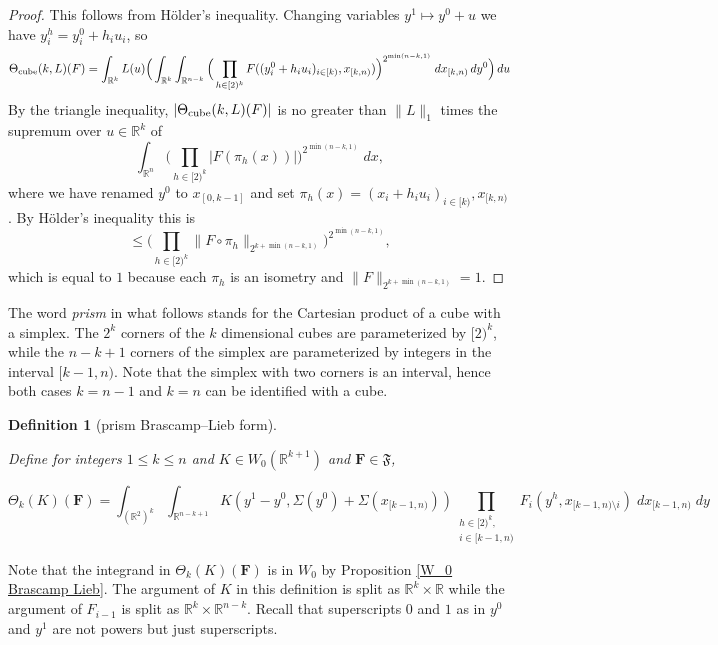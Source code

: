 \documentclass[12pt,reqno]{amsart}
\theoremstyle{plain}
\newtheorem{definition}[theorem]{Definition}
\numberwithin{equation}{section}
\theoremstyle{remark}
\newcommand{\uses}[1]{}
\newcommand{\usesdefs}[1]{}
\newcommand{\lean}[1]{}
\newcommand{\R}{{\mathbb R}}
\newcommand{\F}{\mathbf{F}}
\begin{document}
\begin{proof}
This follows from H\"older's inequality.
Changing variables $y^1\mapsto y^0 + u$ we have $y^h_i=y^0_i+h_i u_i$, so
\[ \Theta_{{\rm cube}}(k,L)(F) = \int_{\R^k} L(u) \Big(\int_{\R^k}\int_{\R^{n-k}} \Big(\prod_{h\in [2)^k} F((y^0_i+h_i u_i)_{i\in [k)}, x_{[k,n)})\Big)^{2^{\min(n-k,1)}}\;dx_{[k,n)}\,dy^0\Big)\,du \]
By the triangle inequality, $|\Theta_{{\rm cube}}(k,L)(F)|$ is no greater than $\|L\|_1$ times the supremum over $u\in\R^k$ of
\[ \int_{\R^n} \Big(\prod_{h\in [2)^k} |F(\pi_h(x))|\Big)^{2^{\min(n-k,1)}}\;dx, \]
where we have renamed $y^0$ to $x_{[0,k-1]}$
and set $\pi_h(x)=(x_i+h_i u_i)_{i\in [k)}, x_{[k,n)}$. By H\"older's inequality this is
\[ \le \Big(\prod_{h\in [2)^k} \|F\circ \pi_h\|_{2^{k+\min(n-k,1)}}\Big)^{2^{\min(n-k,1)}}, \]
which is equal to $1$ because each $\pi_h$ is an isometry and $\|F\|_{2^{k+\min(n-k,1)}}=1$.
\end{proof}


The word {\em prism} in what follows stands for the Cartesian product of a cube with a simplex.
The $2^k$ corners of the $k$ dimensional cubes are parameterized by $[2)^k$,
while the $n-k+1$ corners of the simplex are
parameterized by integers in the interval $[k-1,n)$.
Note that the simplex with two corners is an interval,
hence both cases $k=n-1$ and $k=n$ can be identified with a cube.


\begin{definition}[prism Brascamp--Lieb form]\label{prism Brascamp--Lieb}\uses{W_0 Brascamp Lieb}\usesdefs{auto:Wiener-space-definition,normalized function tuples}
\lean{Auto.prismBrascampLiebForm}
Define for integers $1 \le k\le  n$
and  $K\in W_0(\R^{k+1})$ and $\F\in \mathfrak{F}$,


\begin{equation}\label{auto:K-kernel-form} \Theta_k(K)(\F) = \int_{(\R^{2})^k} \int_{\R^{n-k+1}} K(y^1-y^0, \Sigma(y^0) + \Sigma(x_{[k-1,n)}))
\prod_{\substack{h\in [2)^k,\\i\in [k-1,n)}} F_{i}( y^h, x_{[k-1,n)\setminus i})\;dx_{[k-1,n)}\;dy \end{equation}
\end{definition}

Note that the integrand in $\Theta_k(K)(\F)$ is in $W_0$ by Proposition \ref{W_0 Brascamp Lieb}.
The argument of $K$ in
this definition is split as $\R^{k}\times \R$
while
the argument of $F_{i-1}$  is split as $\R^{k}\times \R^{n-k}$. Recall that superscripts $0$ and $1$ as in $y^0$ and $y^1$ are not powers but just superscripts.
\end{document}
